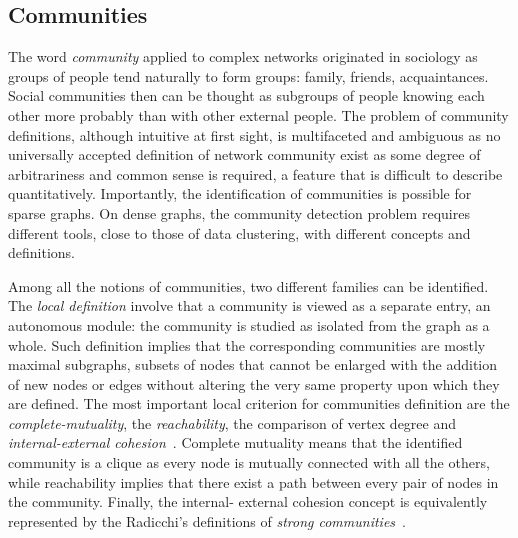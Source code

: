 \subsection{Communities}\label{sec:communities}
The word \emph{community} applied to complex networks originated in sociology as groups of people tend naturally to form groups: family, friends, acquaintances. Social communities then can be thought as subgroups of people knowing each other more probably than with other external people. 
The problem of community definitions, although intuitive at first sight, is multifaceted and ambiguous as no universally accepted definition of network community exist as some degree of arbitrariness and common sense is required, a feature that is difficult to describe quantitatively. 
Importantly, the identification of communities is possible for sparse graphs. On dense graphs, the community detection problem requires different tools, close to those of data clustering, with different concepts and definitions.

Among all the notions of communities, two different families can be identified. The \emph{local definition} involve that a community is viewed as a separate entry, an autonomous module: the community is studied as isolated from the graph as a whole.
Such definition implies that the corresponding communities are mostly maximal subgraphs, subsets of nodes that cannot be enlarged with the addition of new nodes or edges without altering the very same property upon which they are defined.
The most important local criterion for communities definition are the \emph{complete-mutuality}, the \emph{reachability}, the comparison of vertex degree and \emph{internal-external cohesion}~\cite{wasserman1994,alba1973}. Complete mutuality means that the identified community is a clique as every node is mutually connected with all the others, while reachability implies that there exist a path between every pair of nodes in the community. Finally, the internal- external cohesion concept is equivalently represented by the Radicchi's definitions of \emph{strong communities}~\cite{radicchi2004}.

